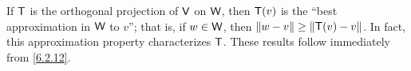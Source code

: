 \begin{note}
  If \(\mathsf{T}\) is the orthogonal projection of \(\mathsf{V}\) on \(\mathsf{W}\), then \(\mathsf{T}(v)\) is the ``best approximation in \(\mathsf{W}\) to \(v\)'';
  that is, if \(w \in \mathsf{W}\), then \(\left\lVert w - v\right\rVert \geq \left\lVert\mathsf{T}(v) - v\right\rVert\).
  In fact, this approximation property characterizes \(\mathsf{T}\).
  These results follow immediately from \cref{6.2.12}.
\end{note}

\exercisesection

\begin{ex}\label{ex:6.6.9}

\end{ex}

\begin{ex}\label{ex:6.6.10}

\end{ex}
